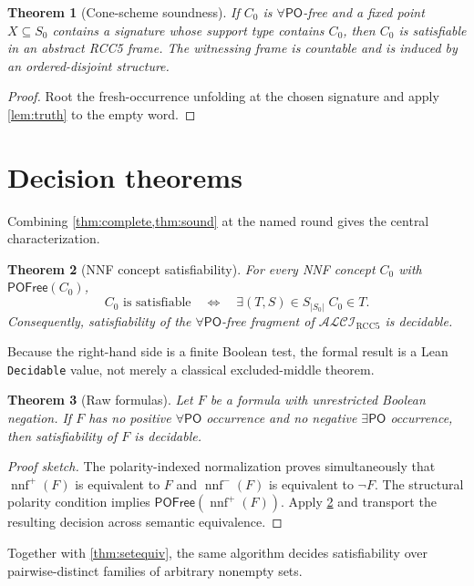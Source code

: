 \documentclass[11pt]{article}
\theoremstyle{plain}
\newtheorem{theorem}{Theorem}[section]
\theoremstyle{definition}
\theoremstyle{remark}
\newcommand{\Logic}{\ensuremath{\mathcal{ALCI}_{\mathrm{RCC5}}}}
\newcommand{\PO}{\ensuremath{\mathsf{PO}}}
\newcommand{\POFree}{\ensuremath{\mathsf{POFree}}}
\newcommand{\code}[1]{\texttt{#1}}
\begin{document}
\begin{theorem}[Cone-scheme soundness]
\label{thm:sound}
If $C_0$ is $\forall\PO$-free and a fixed point $X\subseteq S_0$ contains a
signature whose support type contains $C_0$, then $C_0$ is satisfiable in an
abstract RCC5 frame.  The witnessing frame is countable and is induced by an
ordered-disjoint structure.
\end{theorem}

\begin{proof}
Root the fresh-occurrence unfolding at the chosen signature and apply
\cref{lem:truth} to the empty word.
\end{proof}

\section{Decision theorems}
\label{sec:main}

Combining \cref{thm:complete,thm:sound} at the named round gives the central
characterization.

\begin{theorem}[NNF concept satisfiability]
\label{thm:main}
For every NNF concept $C_0$ with $\POFree(C_0)$,
\[
 C_0\text{ is satisfiable}
 \quad\Longleftrightarrow\quad
 \exists(T,S)\in S_{|S_0|}\; C_0\in T.
\]
Consequently, satisfiability of the $\forall\PO$-free fragment of $\Logic$ is
decidable.
\end{theorem}

Because the right-hand side is a finite Boolean test, the formal result is a
Lean \code{Decidable} value, not merely a classical excluded-middle theorem.

\begin{theorem}[Raw formulas]
\label{thm:raw}
Let $F$ be a formula with unrestricted Boolean negation.  If $F$ has no
positive $\forall\PO$ occurrence and no negative $\exists\PO$ occurrence,
then satisfiability of $F$ is decidable.
\end{theorem}

\begin{proof}[Proof sketch]
The polarity-indexed normalization proves simultaneously that
$\operatorname{nnf}^{+}(F)$ is equivalent to $F$ and
$\operatorname{nnf}^{-}(F)$ is equivalent to $\neg F$.  The structural
polarity condition implies $\POFree(\operatorname{nnf}^{+}(F))$.  Apply
\cref{thm:main} and transport the resulting decision across semantic
equivalence.
\end{proof}

Together with \cref{thm:setequiv}, the same algorithm decides satisfiability
over pairwise-distinct families of arbitrary nonempty sets.
\end{document}
